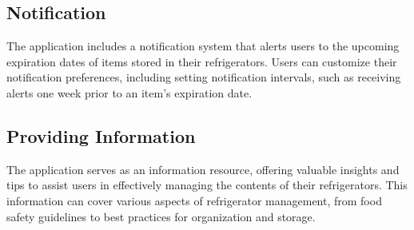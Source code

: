 \documentclass[conference]{IEEEtran}
\begin{document}
\subsection{Notification}
The application includes a notification system that alerts users to the upcoming expiration dates of items stored in their refrigerators. Users can customize their notification preferences, including setting notification intervals, such as receiving alerts one week prior to an item's expiration date.

\subsection{Providing Information}
The application serves as an information resource, offering valuable insights and tips to assist users in effectively managing the contents of their refrigerators. This information can cover various aspects of refrigerator management, from food safety guidelines to best practices for organization and storage.




\end{document}
